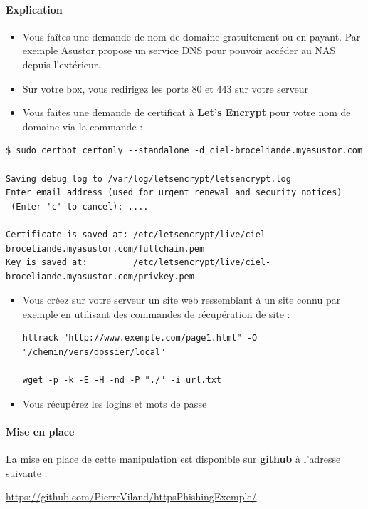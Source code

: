 \documentclass[french, 12pt]{article}%
\newcommand{\itemE}{\item[$\bullet$]}
\begin{document}
\paragraph{Explication}

\begin{itemize}
\itemE Vous faîtes une demande de nom de domaine gratuitement ou en payant. Par exemple Asustor propose un service DNS pour pouvoir accéder au NAS depuis l'extérieur. 
\itemE Sur votre box, vous redirigez les ports 80 et 443 sur votre serveur
\itemE Vous faites une demande de certificat à  \textbf{Let's Encrypt} pour votre nom de domaine via la commande :  
\end{itemize}

\begin{lstlisting}[style=commande]
$ sudo certbot certonly --standalone -d ciel-broceliande.myasustor.com

Saving debug log to /var/log/letsencrypt/letsencrypt.log
Enter email address (used for urgent renewal and security notices)
 (Enter 'c' to cancel): ....
 
Certificate is saved at: /etc/letsencrypt/live/ciel-broceliande.myasustor.com/fullchain.pem
Key is saved at:         /etc/letsencrypt/live/ciel-broceliande.myasustor.com/privkey.pem
\end{lstlisting}    

\begin{itemize}
\itemE Vous créez sur votre serveur un site web ressemblant à un site connu par exemple en utilisant des commandes de récupération de site : 
\begin{lstlisting}[style=commande]
httrack "http://www.exemple.com/page1.html" -O "/chemin/vers/dossier/local"

wget -p -k -E -H -nd -P "./" -i url.txt
\end{lstlisting}



\itemE Vous récupérez les logins et mots de passe
\end{itemize}



\paragraph{Mise en place}

La mise en place de cette manipulation est disponible sur \textbf{github} à l'adresse suivante  : 

\href{https://github.com/PierreViland/httpsPhishingExemple/}{https://github.com/PierreViland/httpsPhishingExemple/}
\end{document}
